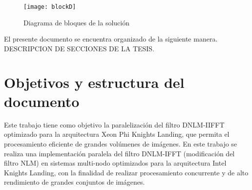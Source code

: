 \begin{figure}[htb]
  \centering
  \texttt{[image: blockD]}
  \caption{Diagrama de bloques de la soluci\'on}
  \label{fig:ltxfig}
\end{figure}

El presente documento se encuentra organizado de la siguiente manera. DESCRIPCION DE SECCIONES DE LA TESIS. 


\section{Objetivos y estructura del documento}


Este trabajo tiene como objetivo la paralelizaci\'on del filtro DNLM-IIFFT optimizado para la arquitectura Xeon Phi Knights Landing, que permita el procesamiento eficiente de grandes vol\'umenes de im\'agenes.
En este trabajo se realiza una implementaci\'on paralela del filtro DNLM-IFFT (modificaci\'on del filtro NLM) en sistemas multi-nodo optimizados para la arquitectura Intel Knights Landing, con la finalidad de realizar procesamiento concurrente y de alto rendimiento de grandes conjuntos de im\'agenes. 



%

